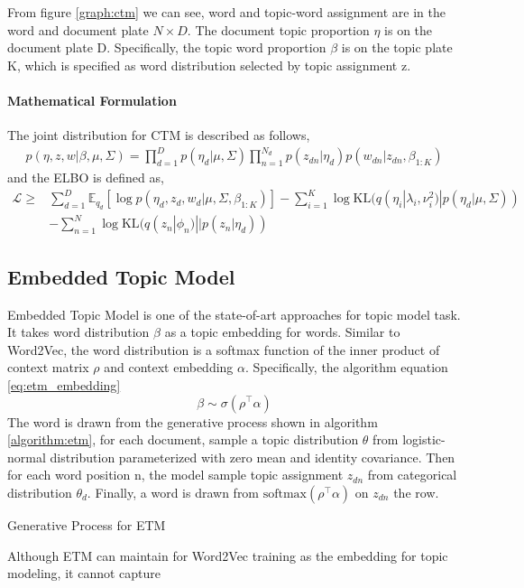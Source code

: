 From figure \ref{graph:ctm} we can see, word and topic-word assignment are in the word and document plate $ N\times D $. The document topic proportion $ \eta $ is on the document plate D. Specifically, the topic word proportion $ \beta $ is on the topic plate K, which is specified as word distribution selected by topic assignment z. 

\paragraph{Mathematical Formulation} The joint distribution for CTM is described as follows,
\begin{align*}
p(\eta,z,w|\beta,\mu,\Sigma)=\prod_{d=1}^{D}p(\eta_d|\mu,\Sigma)\prod_{n=1}^{N_d}p(z_{dn}|\eta_d)p(w_{dn}|z_{dn},\beta_{1:K})
\end{align*}
and the ELBO is defined as,
\begin{align*}
\mathcal{L}\geq&\sum_{d=1}^{D}\mathbb{E}_{q_d}\left[\log p(\eta_d,z_d,w_d|\mu,\Sigma,\beta_{1:K})\right]-\sum_{i=1}^{K}\log\text{KL}(q(\eta_i|\lambda_i,\nu_i^2)|p(\eta_d|\mu,\Sigma))\\
&-\sum_{n=1}^{N}\log\text{KL}(q(z_n|\phi_n)||p(z_n|\eta_d))
\end{align*}
\subsection{Embedded Topic Model} \label{ch2:etm}
Embedded Topic Model \cite{dieng_topic_2019} is one of the state-of-art approaches for topic model task. It takes word distribution $ \beta $ as a topic embedding for words. %
Similar to Word2Vec\cite{mikolov_distributed_nodate}, the word distribution is a softmax function of the inner product of context matrix $ \rho $ and context embedding $ \alpha $. Specifically, the algorithm   equation \ref{eq:etm_embedding}
\begin{equation}\label{eq:etm_embedding}
\beta\sim\sigma(\rho^\top\alpha)
\end{equation}
The word is drawn from the generative process shown in algorithm \ref{algorithm:etm}, for each document, sample a topic distribution $ \theta $ from logistic-normal distribution parameterized with zero mean and identity covariance. Then for each word position n, the model sample topic assignment $ z_{dn} $ from categorical distribution $ \theta_d $. Finally, a word is drawn from $ \text{softmax}(\rho^\top\alpha) $ on $ z_{dn} $ the row.\\
\begin{algorithm}[H]\label{algorithm:etm}
\caption{Generative Process for ETM}
\end{algorithm}
Although ETM can maintain for Word2Vec training as the embedding for topic modeling, it cannot capture 
